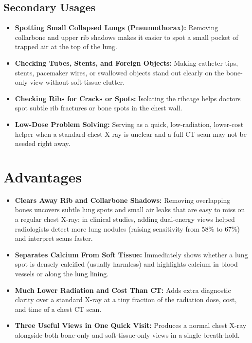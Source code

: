 \subsection{Secondary Usages}
\begin{itemize}
    \item \textbf{Spotting Small Collapsed Lungs (Pneumothorax):} Removing collarbone and upper rib shadows makes it easier to spot a small pocket of trapped air at the top of the lung.
    \item \textbf{Checking Tubes, Stents, and Foreign Objects:} Making catheter tips, stents, pacemaker wires, or swallowed objects stand out clearly on the bone-only view without soft-tissue clutter.
    \item \textbf{Checking Ribs for Cracks or Spots:} Isolating the ribcage helps doctors spot subtle rib fractures or bone spots in the chest wall.
    \item \textbf{Low-Dose Problem Solving:} Serving as a quick, low-radiation, lower-cost helper when a standard chest X-ray is unclear and a full CT scan may not be needed right away.
\end{itemize}

\section{Advantages}
\begin{itemize}
    \item \textbf{Clears Away Rib and Collarbone Shadows:} Removing overlapping bones uncovers subtle lung spots and small air leaks that are easy to miss on a regular chest X-ray; in clinical studies, adding dual-energy views helped radiologists detect more lung nodules (raising sensitivity from 58\% to 67\%) and interpret scans faster.
    \item \textbf{Separates Calcium From Soft Tissue:} Immediately shows whether a lung spot is densely calcified (usually harmless) and highlights calcium in blood vessels or along the lung lining.
    \item \textbf{Much Lower Radiation and Cost Than CT:} Adds extra diagnostic clarity over a standard X-ray at a tiny fraction of the radiation dose, cost, and time of a chest CT scan.
    \item \textbf{Three Useful Views in One Quick Visit:} Produces a normal chest X-ray alongside both bone-only and soft-tissue-only views in a single breath-hold.
\end{itemize}


